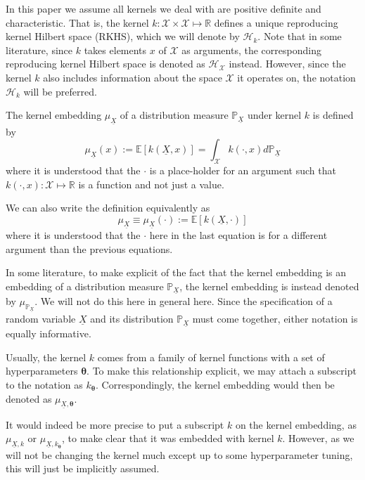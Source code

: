 \documentclass[twoside]{article} \usepackage{aistats2017}
\theoremstyle{definition}
\theoremstyle{remark}
\newcommand{\rv}[1]{\underline{#1}}
\newcommand{\extra}[1]{{\color{ForestGreen} #1}}
\begin{document}
		In this paper we assume all kernels we deal with are positive definite and characteristic. That is, the kernel $k : \mathcal{X} \times \mathcal{X} \mapsto \mathbb{R}$ defines a unique reproducing kernel Hilbert space (RKHS), which we will denote by $\mathcal{H}_{k}$. \extra{Note that in some literature, since $k$ takes elements $x$ of $\mathcal{X}$ as arguments, the corresponding reproducing kernel Hilbert space is denoted as $\mathcal{H}_{\mathcal{X}}$ instead. However, since the kernel $k$ also includes information about the space $\mathcal{X}$ it operates on, the notation $\mathcal{H}_{k}$ will be preferred.}
		 
		The kernel embedding $\mu_{\rv{X}}$ of a distribution measure $\mathbb{P}_{\rv{X}}$ under kernel $k$ is defined by
		\begin{equation}
			\mu_{\rv{X}}(x) := \mathbb{E}[k(\rv{X}, x)] = \int_{\mathcal{X}} k(\cdot, x) d \mathbb{P}_{\rv{X}}
		\label{eq:basic_embedding}
		\end{equation}
		\extra{where it is understood that the $\cdot$ is a place-holder for an argument such that $k(\cdot, x) : \mathcal{X} \mapsto \mathbb{R}$ is a function and not just a value.}
		
		We can also write the definition equivalently as
		\begin{equation}
			\mu_{\rv{X}} \equiv \mu_{\rv{X}}(\cdot) := \mathbb{E}[k(\rv{X}, \cdot)]
		\label{eq:basic_embedding_alternative}
		\end{equation}
		\extra{where it is understood that the $\cdot$ here in the last equation is for a different argument than the previous equations.}
		 
		\extra{In some literature, to make explicit of the fact that the kernel embedding is an embedding of a distribution measure $\mathbb{P}_{\rv{X}}$, the kernel embedding is instead denoted by $\mu_{\mathbb{P}_{\rv{X}}}$. We will not do this here in general here. Since the specification of a random variable $\rv{X}$ and its distribution $\mathbb{P}_{\rv{X}}$ must come together, either notation is equally informative.}
		 
		Usually, the kernel $k$ comes from a family of kernel functions with a set of hyperparameters $\bm{\theta}$. To make this relationship explicit, we may attach a subscript to the notation as $k_{\bm{\theta}}$. Correspondingly, the kernel embedding would then be denoted as $\mu_{\rv{X}, \bm{\theta}}$.

		\extra{It would indeed be more precise to put a subscript $k$ on the kernel embedding, as $\mu_{\rv{X}, k}$ or $\mu_{\rv{X}, k_{\bm{\theta}}}$, to make clear that it was embedded with kernel $k$. However, as we will not be changing the kernel much except up to some hyperparameter tuning, this will just be implicitly assumed.}
			 
\end{document}
